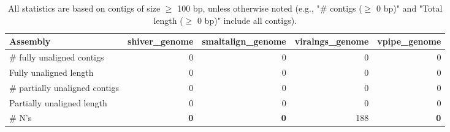\documentclass[12pt,a4paper]{article}
\begin{document}
\begin{table}[ht]
\begin{center}
\caption{All statistics are based on contigs of size $\geq$ 100 bp, unless otherwise noted (e.g., "\# contigs ($\geq$ 0 bp)" and "Total length ($\geq$ 0 bp)" include all contigs).}
\begin{tabular}{|l*{4}{|r}|}
\hline
Assembly & shiver\_genome & smaltalign\_genome & viralngs\_genome & vpipe\_genome \\ \hline
\# fully unaligned contigs & 0 & 0 & 0 & 0 \\ \hline
Fully unaligned length & 0 & 0 & 0 & 0 \\ \hline
\# partially unaligned contigs & 0 & 0 & 0 & 0 \\ \hline
Partially unaligned length & 0 & 0 & 0 & 0 \\ \hline
\# N's & {\bf 0} & {\bf 0} & 188 & {\bf 0} \\ \hline
\end{tabular}
\end{center}
\end{table}
\end{document}
